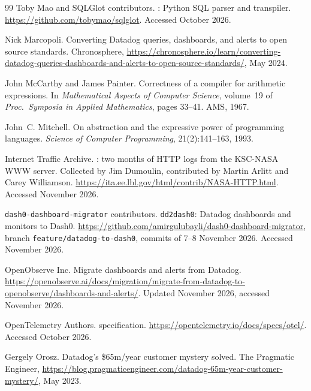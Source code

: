 \begin{thebibliography}{99}
Toby Mao and {SQLGlot contributors}.
: Python {SQL} parser and transpiler.
\newblock \url{https://github.com/tobymao/sqlglot}. Accessed October 2026.

Nick Marcopoli.
\newblock Converting {Datadog} queries, dashboards, and alerts to open source standards.
\newblock Chronosphere,
\url{https://chronosphere.io/learn/converting-datadog-queries-dashboards-and-alerts-to-open-source-standards/}, May 2024.

John McCarthy and James Painter.
\newblock Correctness of a compiler for arithmetic expressions.
\newblock In \emph{Mathematical Aspects of Computer Science}, volume~19 of \emph{Proc.\ Symposia
in Applied Mathematics}, pages 33--41. AMS, 1967.

John~C. Mitchell.
\newblock On abstraction and the expressive power of programming languages.
\newblock \emph{Science of Computer Programming}, 21(2):141--163, 1993.

{Internet Traffic Archive}.
: two months of {HTTP} logs from the {KSC-NASA} {WWW} server.
\newblock Collected by Jim Dumoulin, contributed by Martin Arlitt and Carey Williamson.
\newblock \url{https://ita.ee.lbl.gov/html/contrib/NASA-HTTP.html}. Accessed November 2026.

{\texttt{dash0-dashboard-migrator} contributors}.
\newblock \texttt{dd2dash0}: {Datadog} dashboards and monitors to {Dash0}.
\newblock \url{https://github.com/amirgulubayli/dash0-dashboard-migrator}, branch
\texttt{feature/datadog-to-dash0}, commits of 7--8 November 2026.
Accessed November 2026.

{OpenObserve Inc.}
\newblock Migrate dashboards and alerts from {Datadog}.
\newblock \url{https://openobserve.ai/docs/migration/migrate-from-datadog-to-openobserve/dashboards-and-alerts/}.
Updated November 2026, accessed November 2026.

{OpenTelemetry Authors}.
 specification.
\newblock \url{https://opentelemetry.io/docs/specs/otel/}. Accessed October 2026.

Gergely Orosz.
\newblock Datadog's \$65m/year customer mystery solved.
\newblock The Pragmatic Engineer,
\url{https://blog.pragmaticengineer.com/datadog-65m-year-customer-mystery/}, May 2023.


\end{thebibliography}
